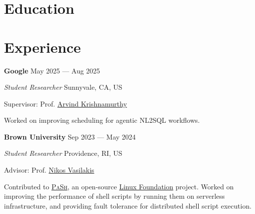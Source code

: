 \documentclass[margin,11pt]{resume}
\newcommand{\descriptionVSpace}{\vspace{0.5ex}\xspace}
\newcommand{\subsectionVSpace}{\vspace{3.5ex}\xspace}
\newcommand{\sectionVSpace}{\vspace{1ex}\xspace} %
\newcommand{\pash}{\textsc{PaSh}\xspace}
\newcommand{\sectionVSpaceCorrection}{\vspace{-3.5ex}} %
\newcommand{\header}[1]{\textbf{#1}\xspace}
\newcommand{\company}[1]{\header{#1}\xspace}
\newcommand{\interval}[2]{#1 --- #2\xspace}
\newcommand{\place}[1]{#1\xspace}
\newcommand{\role}[1]{\textit{#1}\xspace}
\newcommand{\stitle}[1]{#1:\xspace}
\newenvironment{rSubsection}{}{\par\subsectionVSpace}
\newenvironment{rSection}[1]{\sectionVSpaceCorrection\section{#1}\xspace}{\sectionVSpace\par}
\newenvironment{jobDuties}{\descriptionVSpace}{\par}
\begin{document}
\begin{resume}
\begin{rSection}{Education}
\begin{rSubsection}
		\end{rSubsection}
	\end{rSection}

	\begin{rSection}{Experience}
		\begin{rSubsection}
			\company{Google} \hfill \interval{May 2025}{Aug 2025}

			\role{Student Researcher} \hfill \place{Sunnyvale, CA, US}

			\stitle{Supervisor} Prof. \href{https://sites.google.com/cs.washington.edu/arvind}{Arvind Krishnamurthy}

			\begin{jobDuties}
				Worked on improving scheduling for agentic NL2SQL workflows.
			\end{jobDuties}
		\end{rSubsection}

		\begin{rSubsection}
			\company{Brown University} \hfill \interval{Sep 2023}{May 2024}

			\role{Student Researcher} \hfill \place{Providence, RI, US}

			\stitle{Advisor} Prof. \href{https://nikos.vasilak.is}{Nikos Vasilakis}

			\begin{jobDuties}
				Contributed to \href{https://binpa.sh}{\pash}, an open-source \href{https://www.linuxfoundation.org/press/press-release/linux-foundation-to-host-the-pash-project-accelerating-shell-scripting-with-automated-parallelization-for-industrial-use-cases}{Linux Foundation} project.
				Worked on improving the performance of shell scripts by running them on serverless infrastructure, and providing fault tolerance for distributed shell script execution.
			\end{jobDuties}
		\end{rSubsection}






\end{rSection}
\end{resume}
\end{document}

